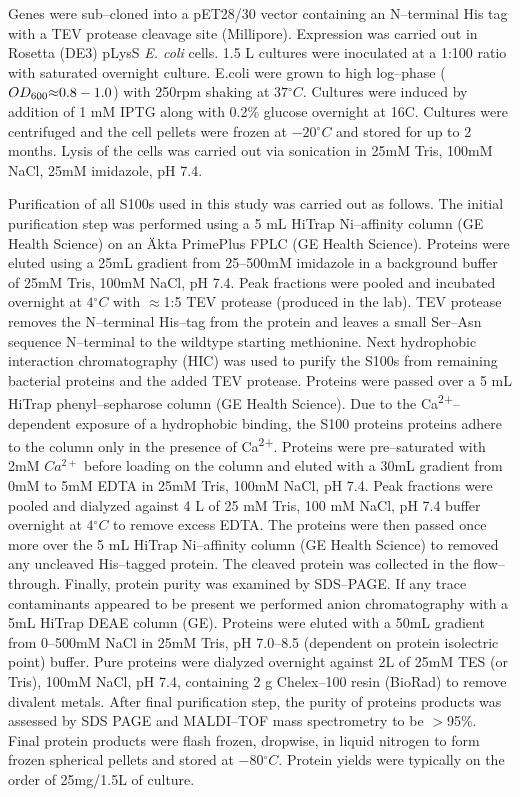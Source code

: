 Genes were sub--cloned into a pET28/30 vector containing an N--terminal
His tag with a TEV protease cleavage site (Millipore). Expression
was carried out in Rosetta (DE3) pLysS \textit{E. coli} cells. 1.5
L cultures were inoculated at a 1:100 ratio with saturated overnight
culture. E.coli were grown to high log--phase ($OD_{600}\text{\ensuremath{\approx}}0.8-1.0$)
with 250rpm shaking at $37{^\circ}C$. Cultures were induced by addition
of 1 mM IPTG along with 0.2\% glucose overnight at 16\textdegree C.
Cultures were centrifuged and the cell pellets were frozen at $-20{^\circ}C$
and stored for up to 2 months. Lysis of the cells was carried out
via sonication in 25mM Tris, 100mM NaCl, 25mM imidazole, pH 7.4. 

Purification of all S100s used in this study was carried out as follows.
The initial purification step was performed using a 5 mL HiTrap Ni--affinity
column (GE Health Science) on an Äkta PrimePlus FPLC (GE Health Science).
Proteins were eluted using a 25mL gradient from 25--500mM imidazole
in a background buffer of 25mM Tris, 100mM NaCl, pH 7.4. Peak fractions
were pooled and incubated overnight at $4{^\circ}C$ with $\approx$1:5
TEV protease (produced in the lab). TEV protease removes the N--terminal
His--tag from the protein and leaves a small Ser--Asn sequence N--terminal
to the wildtype starting methionine. Next hydrophobic interaction
chromatography (HIC) was used to purify the S100s from remaining bacterial
proteins and the added TEV protease. Proteins were passed over a 5
mL HiTrap phenyl--sepharose column (GE Health Science). Due to the
Ca\textsuperscript{2+}--dependent exposure of a hydrophobic binding,
the S100 proteins proteins adhere to the column only in the presence
of Ca\textsuperscript{2+}. Proteins were pre--saturated with 2mM $Ca^{2+}$
before loading on the column and eluted with a 30mL gradient from
0mM to 5mM EDTA in 25mM Tris, 100mM NaCl, pH 7.4. Peak fractions were
pooled and dialyzed against 4 L of 25 mM Tris, 100 mM NaCl, pH 7.4
buffer overnight at $4{^\circ}C$ to remove excess EDTA. The proteins
were then passed once more over the 5 mL HiTrap Ni--affinity column
(GE Health Science) to removed any uncleaved His--tagged protein. The
cleaved protein was collected in the flow--through. Finally, protein
purity was examined by SDS--PAGE. If any trace contaminants appeared
to be present we performed anion chromatography with a 5mL HiTrap
DEAE column (GE). Proteins were eluted with a 50mL gradient from 0--500mM
NaCl in 25mM Tris, pH 7.0–8.5 (dependent on protein isolectric point)
buffer. Pure proteins were dialyzed overnight against 2L of 25mM TES
(or Tris), 100mM NaCl, pH 7.4, containing 2 g Chelex--100 resin (BioRad)
to remove divalent metals. After final purification step, the purity
of proteins products was assessed by SDS PAGE and MALDI--TOF mass spectrometry
to be $>$95\%. Final protein products were flash frozen, dropwise, in liquid nitrogen
to form frozen spherical pellets and stored at $-80{^\circ}C$. Protein
yields were typically on the order of 25mg/1.5L of culture.


